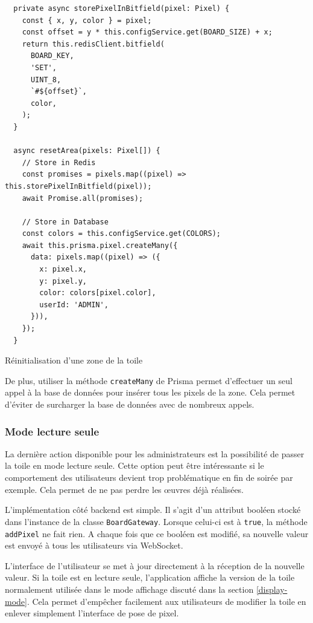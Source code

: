 \begin{listing}[h]
  \begin{verbatim}
  private async storePixelInBitfield(pixel: Pixel) {
    const { x, y, color } = pixel;
    const offset = y * this.configService.get(BOARD_SIZE) + x;
    return this.redisClient.bitfield(
      BOARD_KEY,
      'SET',
      UINT_8,
      `#${offset}`,
      color,
    );
  }

  async resetArea(pixels: Pixel[]) {
    // Store in Redis
    const promises = pixels.map((pixel) => this.storePixelInBitfield(pixel));
    await Promise.all(promises);

    // Store in Database
    const colors = this.configService.get(COLORS);
    await this.prisma.pixel.createMany({
      data: pixels.map((pixel) => ({
        x: pixel.x,
        y: pixel.y,
        color: colors[pixel.color],
        userId: 'ADMIN',
      })),
    });
  }
\end{verbatim}
  \caption{Réinitialisation d'une zone de la toile}
  \label{listing:admin-reset-area}
\end{listing}

De plus, utiliser la méthode \texttt{createMany} de Prisma permet d'effectuer un seul appel à la base de données pour insérer tous les pixels de la zone. Cela permet d'éviter de surcharger la base de données avec de nombreux appels.

\subsubsection{Mode lecture seule}

La dernière action disponible pour les administrateurs est la possibilité de passer la toile en mode lecture seule. Cette option peut être intéressante si le comportement des utilisateurs devient trop problématique en fin de soirée par exemple. Cela permet de ne pas perdre les \oe{}uvres déjà réalisées.

L'implémentation côté backend est simple. Il s'agit d'un attribut booléen stocké dans l'instance de la classe \texttt{BoardGateway}. Lorsque celui-ci est à \texttt{true}, la méthode \texttt{addPixel} ne fait rien. A chaque fois que ce booléen est modifié, sa nouvelle valeur est envoyé à tous les utilisateurs via WebSocket.

L'interface de l'utilisateur se met à jour directement à la réception de la nouvelle valeur. Si la toile est en lecture seule, l'application affiche la version de la toile normalement utilisée dans le mode affichage discuté dans la section \ref{display-mode}. Cela permet d'empêcher facilement aux utilisateurs de modifier la toile en enlever simplement l'interface de pose de pixel.

